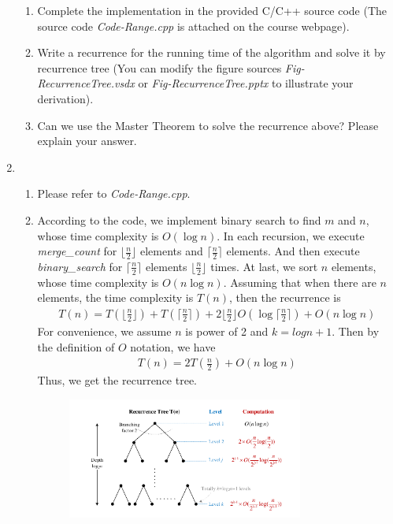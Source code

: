 \documentclass[12pt,a4paper]{article}
\makeatletter
\newtheorem*{solution}{Solution}
\theoremstyle{definition}
\renewenvironment{solution}[1][Solution] {\par\pushQED{\qed}\normalfont\topsep6\p@\@plus6\p@\relax\trivlist\item[\hskip\labelsep\bfseries#1\@addpunct{.}]\ignorespaces}{\popQED\endtrivlist\@endpefalse} \makeatother
\makeatother
\begin{document}
\begin{enumerate}
\begin{enumerate}
\item
Complete the implementation in the provided C/C++ source code {\color{blue}(The source code \emph{Code-Range.cpp} is attached on the course webpage)}.
\item
Write a recurrence for the running time of the algorithm and solve it by recurrence tree {\color{blue}(You can modify the figure sources \emph{Fig-RecurrenceTree.vsdx} or \emph{Fig-RecurrenceTree.pptx} to illustrate your derivation)}.
\item
Can we use the Master Theorem to solve the recurrence above? Please explain your answer.
\end{enumerate}
\begin{solution}
~
\begin{enumerate}
    \item Please refer to \emph{Code-Range.cpp}.
    \item According to the code, we implement binary search to find $m$ and $n$, whose time complexity is $O(\log n)$. In each recursion, we execute \emph{merge\_count} for $\lfloor \frac{n}{2} \rfloor$ elements and  $\lceil \frac{n}{2} \rceil$ elements. And then execute \emph{binary\_search} for $\lceil \frac{n}{2} \rceil$ elements $\lfloor \frac{n}{2} \rfloor$ times. At last, we sort $n$ elements, whose time complexity is $O(n\log n)$. Assuming that when there are $n$ elements, the time complexity is $T(n)$, then the recurrence is
    \begin{align}
        T(n) = T(\lfloor \frac{n}{2} \rfloor) + T(\lceil \frac{n}{2} \rceil) + 2\lfloor \frac{n}{2} \rfloor O(\log\lceil \frac{n}{2} \rceil) + O(n\log n)
    \end{align}
    For convenience, we assume $n$ is power of 2 and $k = log n+1$. Then by the definition of $O$ notation, we have
    \begin{align}
        T(n) = 2T(\frac{n}{2}) + O(n\log n)
    \end{align}
    Thus, we get the recurrence tree.\\
    \begin{figure}[htbp]
    \centering
    \includegraphics[width=0.78\textwidth]{Fig-RecurrenceTree.pdf}

\end{figure}
\end{enumerate}
\end{solution}
\end{enumerate}
\end{document}

